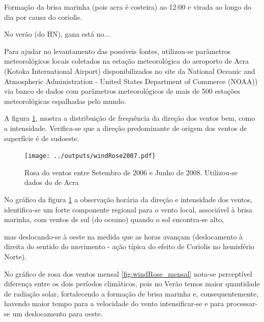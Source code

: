 Formação da brisa marinha (pois acra é costeira) ao 12:00 e virada ao longo 
do dia por causa do coriolis.

No verão (do HN), gana está no... 


Para ajudar no levantamento das possíveis fontes, utilizou-se parâmetros 
meteorológicos locais coletados na estação meteorológica do aeroporto de Acra 
(Kotoka International Airport) disponibilizados no site da 
National Oceanic and Atmospheric Administration - United States Department of 
Commerce (NOAA)) via banco de dados com parâmetros meteorológicos 
de mais de 500 estações meteorológicas espalhadas pelo mundo.

A figura \ref{fg:rosaCompleta}, 
mostra a distribuição de frequência da direção dos ventos bem, como a 
intensidade. 
Verifica-se que a direção predominante de origem dos ventos de superfície
é de sudoeste. 

\begin{figure}[H]
  \centering
  \texttt{[image: ../outputs/windRose2007.pdf]}
  \caption{Rosa do ventos entre
           Setembro de 2006 e Junho de 2008. Utilizou-se dados 
           do  de Acra 
           \label{fg:rosaCompleta}}
\end{figure}%

No gráfico da figura \ref{fg:rosaCompleta}%
 a observação horária da direção e 
intensidade dos ventos, identifica-se um forte componente regional para o vento local, associável à brisa marinha, com ventos de sul (do oceano) quando o sol encontra-se alto,%

 mas deslocando-se à oeste na medida que as horas avançam (deslocamento à direita do sentido do movimento - ação típica do efeito de Coriolis no hemisfério Norte). 

No gráfico de rosa dos ventos mensal \ref{fig:windRose_mensal}
 nota-se 
perceptível diferença entre os dois períodos climáticos, 
pois no Verão temos maior quantidade de radiação solar, fortalecendo a 
formação de brisa marinha e, consequentemente, havendo maior tempo para a velocidade do vento intensificar-se e para processar-se um deslocamento para oeste.

